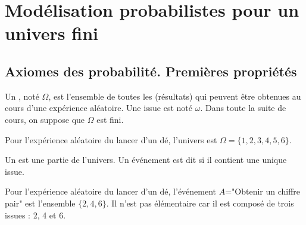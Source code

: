 \documentclass{book}
\begin{document}
\section{Modélisation probabilistes pour un univers fini}
\subsection{Axiomes des probabilité. Premières propriétés}
\begin{Definition}[Univers]
Un , noté $\Omega$, est l'ensemble de toutes les  (résultats) qui peuvent être obtenues au cours d'une expérience aléatoire. Une issue est noté $\omega$. Dans toute la suite de cours, on suppose que $\Omega$ est fini. 
\end{Definition}
\begin{Exemple}[Lancer de un dé]
Pour l'expérience aléatoire du lancer d'un dé, l'univers est $\Omega=\{1,2,3,4,5,6\}$. 
\end{Exemple}


\begin{Definition}[Événement]
Un  est une partie de l'univers. Un événement est dit  si il contient une unique issue.
\end{Definition} 
\begin{Exemple}
Pour l'expérience aléatoire du lancer d'un dé, l'événement $A$="Obtenir un chiffre pair" est l'ensemble $\{2,4,6\}$. Il n'est pas élémentaire car il est composé de trois issues : 2, 4 et 6.
\end{Exemple}
\end{document}
